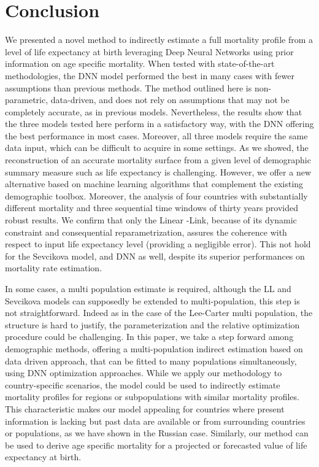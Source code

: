 \documentclass[a4,11pt]{article}
\begin{document}
\section{Conclusion}

We presented a novel method to indirectly estimate a full mortality profile from a level of life expectancy at birth leveraging Deep Neural Networks using prior information on age specific mortality. When tested with state-of-the-art methodologies, the DNN model performed the best in many cases with fewer assumptions than previous methods.
The method outlined here is non-parametric, data-driven, and does not rely on assumptions that may not be completely accurate, as in previous models. Nevertheless, the results show that the three models tested here perform in a satisfactory way, with the DNN offering the best performance in most cases. Moreover, all three models require the same data input, which can be difficult to acquire in some settings. As we showed, the reconstruction of an accurate mortality surface from a given level of demographic summary measure such as life expectancy is challenging. However, we offer a new alternative based on machine learning algorithms that complement the existing demographic toolbox. Moreover, the analysis of four countries with substantially different mortality and three sequential time windows of thirty years provided robust results. 
We confirm that only the Linear -Link, because of its dynamic constraint and consequential reparametrization, assures the coherence with respect to input life expectancy level (providing a negligible error). This not hold for the Sevcikova model, and DNN as well, despite its superior performances on mortality rate estimation.

In some cases, a multi population estimate is required, although the LL and Sevcikova models can supposedly be extended to multi-population, this step is not straightforward.
Indeed as in the case of the Lee-Carter multi population, the structure is hard to justify, the parameterization and the relative optimization procedure could be challenging. In this paper, we take a step forward among demographic methods, offering a multi-population indirect estimation based on data driven approach, that can be fitted to many populations simultaneously, using DNN optimization approaches.
While we apply our methodology to country-specific scenarios, the model could be used to indirectly estimate mortality profiles for regions or subpopulations with similar mortality profiles. This characteristic makes our model appealing for countries where present information is lacking but past data are available or from surrounding countries or populations, as we have shown in the Russian case. Similarly, our method can be used to derive age specific mortality for a projected or forecasted value of life expectancy at birth. 
\end{document}
